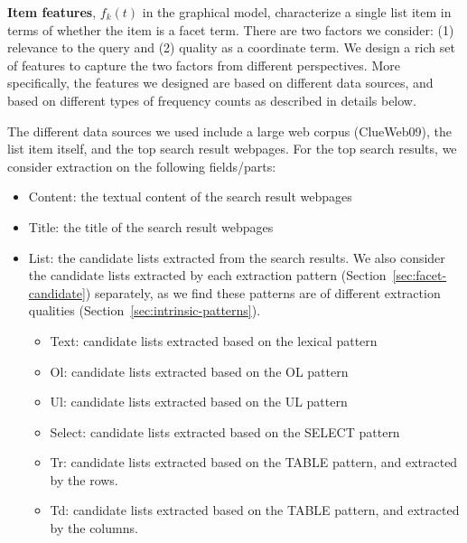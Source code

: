 \textbf{Item features}, $f_k(t)$ in the graphical model, characterize a single list item in terms of whether the item is a facet term. There are two factors we consider: (1) relevance to the query and (2) quality as a coordinate term. We design a rich set of features to capture the two factors from different perspectives. More specifically, the features we designed are based on different data sources, and based on different types of frequency counts as described in details below.

The different data sources we used include a large web corpus (ClueWeb09), the list item itself, and the top search result webpages. For the top search results, we consider extraction on the following fields/parts:
\begin{itemize}
 \item Content: the textual content of the search result webpages
 \item Title: the title of the search result webpages
 \item List: the candidate lists extracted from the search results. We also consider the candidate lists extracted by each extraction pattern (Section~\ref{sec:facet-candidate}) separately, as we find these patterns are of different extraction qualities (Section~\ref{sec:intrinsic-patterns}).
  \begin{itemize}
   \item Text: candidate lists extracted based on the lexical pattern
   \item Ol: candidate lists extracted based on the OL pattern
   \item Ul: candidate lists extracted based on the UL pattern
   \item Select: candidate lists extracted based on the SELECT pattern
   \item Tr: candidate lists extracted based on the TABLE pattern, and extracted by the rows.
   \item Td: candidate lists extracted based on the TABLE pattern, and extracted by the columns.
  \end{itemize}
\end{itemize}

